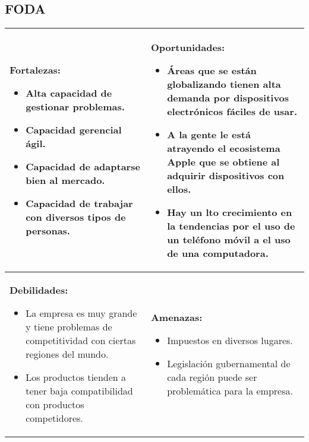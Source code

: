 \documentclass{article}
\begin{document}
\subsection{FODA}
\begin{center}
   \begin{tabular}{ | p{8.25cm} | p{8.25cm} | }
        \hline
            \textbf{Fortalezas: } 
            \begin{itemize}
                \item Alta capacidad de gestionar problemas.
                \item Capacidad gerencial ágil.
                \item Capacidad de adaptarse bien al mercado.
                \item Capacidad de trabajar con diversos tipos de personas.
            \end{itemize}
            &
            \textbf{Oportunidades: } 
            \begin{itemize}
                \item Áreas que se están globalizando tienen alta demanda por dispositivos electrónicos fáciles de usar.
                \item A la gente le está atrayendo el ecosistema Apple que se obtiene al adquirir dispositivos con ellos.
                \item Hay un lto crecimiento en la tendencias por el uso de un teléfono móvil a el uso de una computadora. 
            \end{itemize}
            \\ 
        \hline
            \textbf{Debilidades: } 
            \begin{itemize}
                \item La empresa es muy grande y tiene problemas de competitividad con ciertas regiones del mundo.
                \item Los productos tienden a tener baja compatibilidad con productos competidores.
            \end{itemize}
            &
            \textbf{Amenazas: } 
            \begin{itemize}
                \item Impuestos en diversos lugares.
                \item Legislación gubernamental de cada región puede ser problemática para la empresa.
            \end{itemize}
            \\ 
        \hline
   \end{tabular}
\end{center}
\end{document}
